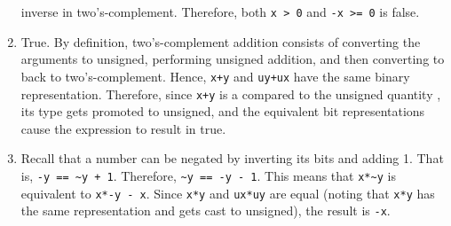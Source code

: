 \documentclass[12pt]{article}
\newenvironment{sol}[1][Solution]{\begin{trivlist}
		\item[\hskip \labelsep {\bfseries #1:}]}{\end{trivlist}}
\begin{document}
\begin{sol}
\begin{enumerate}[label=(\alph*)]
		inverse in two's-complement. Therefore, both \texttt{x > 0} and \texttt{-x >= 0} is
		false.
		\item True. By definition, two's-complement addition consists of converting the arguments
		to unsigned, performing unsigned addition, and then converting to back to two's-complement.
		Hence, \texttt{x+y} and \texttt{uy+ux} have the same binary representation. Therefore,
		since \texttt{x+y} is a compared to the unsigned quantity , its type
		gets promoted to unsigned, and the equivalent bit representations cause the expression
		to result in true.
		\item Recall that a number can be negated by inverting its bits and adding 1.
		That is, \texttt{-y == \texttt{\~{}y + 1}}. Therefore, \texttt{\~{}y == -y - 1}.
		This means that \texttt{x*\~{}y} is equivalent to \texttt{x*-y - x}. Since
		\texttt{x*y} and \texttt{ux*uy} are equal (noting that \texttt{x*y} has the same
		representation and gets cast to unsigned), the result is \texttt{-x}.
	\end{enumerate}
\end{sol}
\end{document}
